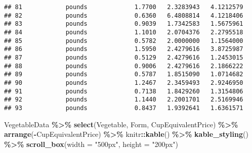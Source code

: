\documentclass[
]{article}
\newenvironment{Shaded}{\begin{snugshade}}{\end{snugshade}}
\newcommand{\AttributeTok}[1]{\textcolor[rgb]{0.13,0.29,0.53}{#1}}
\newcommand{\FunctionTok}[1]{\textcolor[rgb]{0.13,0.29,0.53}{\textbf{#1}}}
\newcommand{\NormalTok}[1]{#1}
\newcommand{\SpecialCharTok}[1]{\textcolor[rgb]{0.81,0.36,0.00}{\textbf{#1}}}
\newcommand{\StringTok}[1]{\textcolor[rgb]{0.31,0.60,0.02}{#1}}
\begin{document}
\begin{verbatim}
## 81            pounds             1.7700   2.3283943   4.1212579
## 82            pounds             0.6360   6.4808814   4.1218406
## 83            pounds             0.9039   1.7342583   1.5675961
## 84            pounds             1.1010   2.0704376   2.2795518
## 85            pounds             0.5782   2.0000000   1.1564000
## 86            pounds             1.5950   2.4279616   3.8725987
## 87            pounds             0.5129   2.4279616   1.2453015
## 88            pounds             0.9006   2.4279616   2.1866222
## 89            pounds             0.5787   1.8515090   1.0714682
## 90            pounds             1.2467   2.3459493   2.9246950
## 91            pounds             0.7138   1.8429260   1.3154806
## 92            pounds             1.1440   2.2001701   2.5169946
## 93            pounds             0.8437   1.9392641   1.6361571
\end{verbatim}

\begin{Shaded}
\begin{Highlighting}[]
\NormalTok{VegetableData }\SpecialCharTok{\%\textgreater{}\%} \FunctionTok{select}\NormalTok{(Vegetable, Form, CupEquivalentPrice) }\SpecialCharTok{\%\textgreater{}\%} \FunctionTok{arrange}\NormalTok{(}\SpecialCharTok{{-}}\NormalTok{CupEquivalentPrice) }\SpecialCharTok{\%\textgreater{}\%}\NormalTok{   knitr}\SpecialCharTok{::}\FunctionTok{kable}\NormalTok{() }\SpecialCharTok{\%\textgreater{}\%} \FunctionTok{kable\_styling}\NormalTok{() }\SpecialCharTok{\%\textgreater{}\%} \FunctionTok{scroll\_box}\NormalTok{(}\AttributeTok{width =} \StringTok{"500px"}\NormalTok{, }\AttributeTok{height =} \StringTok{"200px"}\NormalTok{)}
\end{Highlighting}
\end{Shaded}
\end{document}
